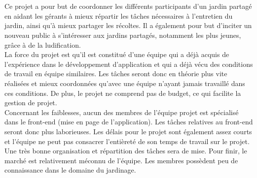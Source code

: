 \documentclass{report}
\begin{document}
    
    \section*{\color{orange}{\Large Finalités}}
    Ce projet a pour but de coordonner les différents participants d'un jardin partagé en aidant les gérants à mieux répartir les tâches nécessaires à l'entretien du jardin, ainsi qu'à mieux partager les récoltes. Il a également pour but d'inciter un nouveau public à s'intéresser aux jardins partagés, notamment les plus jeunes, grâce à de la ludification.\\
    
    La force du projet est qu'il est constitué d'une équipe qui a déjà acquis de l'expérience dans le développement d'application et qui a déjà vécu des conditions de travail en équipe similaires. Les tâches seront donc en théorie plus vite réalisées et mieux coordonnées qu'avec une équipe n'ayant jamais travaillé dans ces conditions. De plus, le projet ne comprend pas de budget, ce qui facilite la gestion de projet.\\
    Concernant les faiblesses, aucun des membres de l'équipe projet est spécialisé dans le front-end (mise en page de l'application). Les tâches relatives au front-end seront donc plus laborieuses. Les délais pour le projet sont également assez courts et l'équipe ne peut pas consacrer l'entièreté de son temps de travail sur le projet. Une très bonne organisation et répartition des tâches sera de mise. Pour finir, le marché est relativement méconnu de l'équipe. Les membres possèdent peu de connaissance dans le domaine du jardinage.\\
    
    
    
\end{document}

